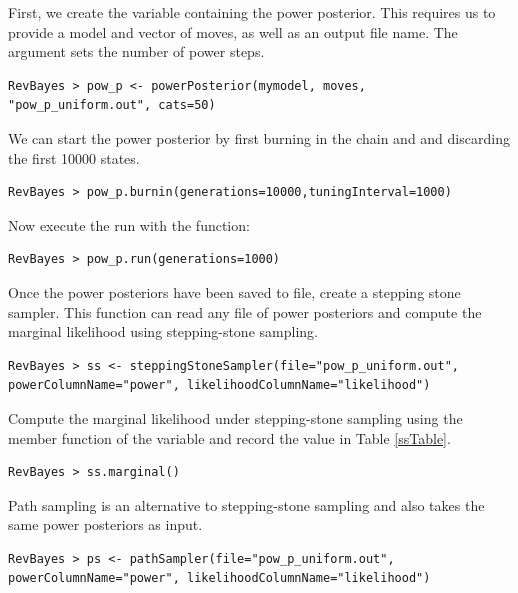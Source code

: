 First, we create the variable containing the power posterior. This requires us to provide a model and vector of moves, as well as an output file name. The  argument sets the number of power steps.
{\tt \begin{snugshade*}
\begin{lstlisting}
RevBayes > pow_p <- powerPosterior(mymodel, moves, "pow_p_uniform.out", cats=50) 
\end{lstlisting}
\end{snugshade*}}

We can start the power posterior by first burning in the chain and and discarding the first 10000 states.  
{\tt \begin{snugshade*}
\begin{lstlisting}
RevBayes > pow_p.burnin(generations=10000,tuningInterval=1000)
\end{lstlisting}
\end{snugshade*}}

Now execute the run with the  function:
{\tt \begin{snugshade*}
\begin{lstlisting}
RevBayes > pow_p.run(generations=1000)  
\end{lstlisting}
\end{snugshade*}}

Once the power posteriors have been saved to file, create a stepping stone sampler. This function can read any file of power posteriors and compute the marginal likelihood using stepping-stone sampling. 
{\tt \small \begin{snugshade*}
\begin{lstlisting}
RevBayes > ss <- steppingStoneSampler(file="pow_p_uniform.out", powerColumnName="power", likelihoodColumnName="likelihood")
\end{lstlisting}
\end{snugshade*}}

Compute the marginal likelihood under stepping-stone sampling using the member function  of the  variable and record the value in Table \ref{ssTable}.
{\tt \begin{snugshade*}
\begin{lstlisting}
RevBayes > ss.marginal() 
\end{lstlisting}
\end{snugshade*}}

Path sampling is an alternative to stepping-stone sampling and also takes the same power posteriors as input. 
{\tt \small \begin{snugshade*}
\begin{lstlisting}
RevBayes > ps <- pathSampler(file="pow_p_uniform.out", powerColumnName="power", likelihoodColumnName="likelihood")
\end{lstlisting}
\end{snugshade*}}

